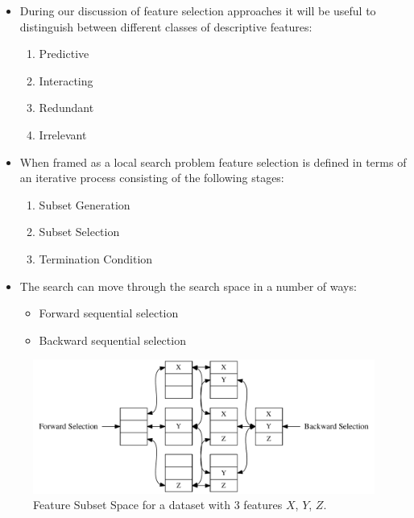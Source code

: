 \documentclass[xcolor={table}]{beamer}
\begin{document}
\begin{frame} 
\begin{itemize}
\item During our discussion of feature selection approaches it will be useful to distinguish between different classes of descriptive features:
\begin{enumerate}
	\item \alert{Predictive}
	\item \alert{Interacting}
	\item \alert{Redundant}	
	\item \alert{Irrelevant}
\end{enumerate}
\end{itemize}
\end{frame} 

\begin{frame} 
\begin{itemize}
\item When framed as a local search problem feature selection is defined in terms of an iterative process consisting of the following stages:
\begin{enumerate}
\item \alert{Subset Generation}
\item \alert{Subset Selection}
\item \alert{Termination Condition}
\end{enumerate}
\item The search can move through the search space in a number of ways:
\begin{itemize}
\item \alert{Forward sequential selection}
\item \alert{Backward sequential selection}
\end{itemize}
\end{itemize}
\end{frame} 

\begin{frame} 
\begin{figure}
	\includegraphics[width=\textwidth]{./images/FeatureSubsetSpace.pdf}
	\caption{Feature Subset Space for a dataset with 3 features $X$, $Y$, $Z$.}
	\label{fig:featureSubsetSpace}
\end{figure}
\end{frame} 
\end{document}
